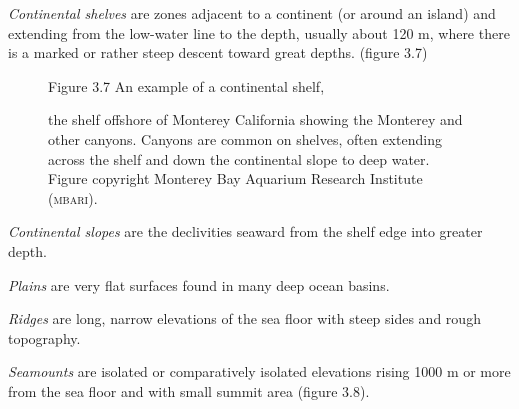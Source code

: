 \textit{Continental shelves} are
zones adjacent to a continent (or around an island) and extending from
the low-water line to the depth, usually about 120 m, where there is a
marked or rather steep descent toward great depths. (figure 3.7)
\begin{figure}[b!]
\vspace{-2ex}
\footnotesize
Figure 3.7 An example of a continental shelf,\rule{0pt}{3ex} the shelf
offshore of Monterey California showing the Monterey and other
canyons.  Canyons are common on shelves, often extending across the
shelf and down the continental slope to deep water. Figure copyright
Monterey Bay Aquarium Research Institute (\textsc{mbari}).
\label{fig:canyon}
\end{figure}

\textit{Continental slopes} are the
declivities seaward from the shelf edge into greater depth.

\textit{Plains} are very flat surfaces found in
many deep ocean basins.

\textit{Ridges} are long, narrow elevations of
the sea floor with steep sides and rough topography.

\textit{Seamounts} are isolated or
comparatively isolated elevations rising 1000 m or more from the sea
floor and with small summit area (figure 3.8).

